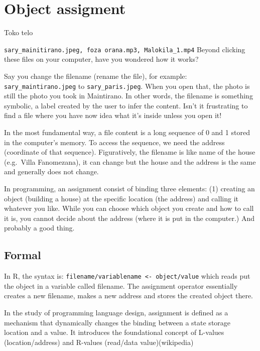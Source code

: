 \documentclass[
  letterpaper,
  DIV=11,
  numbers=noendperiod]{scrreprt}
\begin{document}
\chapter{Object assigment}\label{sec-assignment}

Toko telo

\texttt{sary\_mainitirano.jpeg,\ foza\ orana.mp3,\ Malok\textquotesingle{}ila\_1.mp4}
Beyond clicking these files on your computer, have you wondered how it
works?

Say you change the filename (rename the file), for example:
\texttt{sary\_maintirano.jpeg} to \texttt{sary\_paris.jpeg}. When you
open that, the photo is still the photo you took in Maintirano. In other
words, the filename is something symbolic, a label created by the user
to infer the content. Isn't it frustrating to find a file where you have
now idea what it's inside unless you open it!

In the most fundamental way, a file content is a long sequence of 0 and
1 stored in the computer's memory. To access the sequence, we need the
address (coordinate of that sequence). Figuratively, the filename is
like name of the house (e.g.~Villa Fanomezana), it can change but the
house and the address is the same and generally does not change.

In programming, an assignment consist of binding three elements: (1)
creating an object (building a house) at the specific location (the
address) and calling it whatever you like. While you can choose which
object you create and how to call it is, you cannot decide about the
address (where it is put in the computer.) And probably a good thing.

\section*{Formal}\label{formal-28}


In R, the syntax is:
\texttt{filename/variablename\ \textless{}-\ object/value} which reads
put the object in a variable called filename. The assignment operator
essentially creates a new filename, makes a new address and stores the
created object there.

In the study of programming language design, assignment is defined as a
mechanism that dynamically changes the binding between a state storage
location and a value. It introduces the foundational concept of L-values
(location/address) and R-values (read/data value)(wikipedia)
\end{document}
